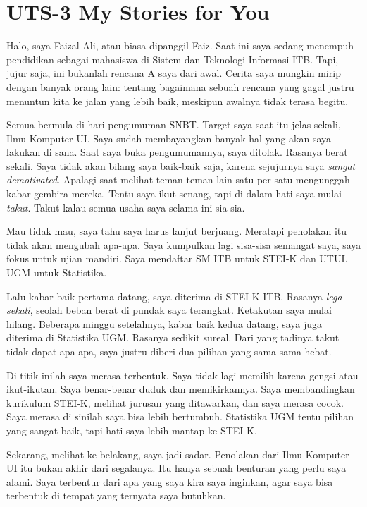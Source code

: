 \documentclass[
  letterpaper,
  DIV=11,
  numbers=noendperiod]{scrreprt}
\begin{document}

\chapter{UTS-3 My Stories for You}\label{uts-3-my-stories-for-you}

Halo, saya Faizal Ali, atau biasa dipanggil Faiz. Saat ini saya sedang
menempuh pendidikan sebagai mahasiswa di Sistem dan Teknologi Informasi
ITB. Tapi, jujur saja, ini bukanlah rencana A saya dari awal. Cerita
saya mungkin mirip dengan banyak orang lain: tentang bagaimana sebuah
rencana yang gagal justru menuntun kita ke jalan yang lebih baik,
meskipun awalnya tidak terasa begitu.

Semua bermula di hari pengumuman SNBT. Target saya saat itu jelas
sekali, Ilmu Komputer UI. Saya sudah membayangkan banyak hal yang akan
saya lakukan di sana. Saat saya buka pengumumannya, saya ditolak.
Rasanya berat sekali. Saya tidak akan bilang saya baik-baik saja, karena
sejujurnya saya \emph{sangat demotivated}. Apalagi saat melihat
teman-teman lain satu per satu mengunggah kabar gembira mereka. Tentu
saya ikut senang, tapi di dalam hati saya mulai \emph{takut}. Takut
kalau semua usaha saya selama ini sia-sia.

Mau tidak mau, saya tahu saya harus lanjut berjuang. Meratapi penolakan
itu tidak akan mengubah apa-apa. Saya kumpulkan lagi sisa-sisa semangat
saya, saya fokus untuk ujian mandiri. Saya mendaftar SM ITB untuk STEI-K
dan UTUL UGM untuk Statistika.

Lalu kabar baik pertama datang, saya diterima di STEI-K ITB. Rasanya
\emph{lega sekali}, seolah beban berat di pundak saya terangkat.
Ketakutan saya mulai hilang. Beberapa minggu setelahnya, kabar baik
kedua datang, saya juga diterima di Statistika UGM. Rasanya sedikit
sureal. Dari yang tadinya takut tidak dapat apa-apa, saya justru diberi
dua pilihan yang sama-sama hebat.

Di titik inilah saya merasa terbentuk. Saya tidak lagi memilih karena
gengsi atau ikut-ikutan. Saya benar-benar duduk dan memikirkannya. Saya
membandingkan kurikulum STEI-K, melihat jurusan yang ditawarkan, dan
saya merasa cocok. Saya merasa di sinilah saya bisa lebih bertumbuh.
Statistika UGM tentu pilihan yang sangat baik, tapi hati saya lebih
mantap ke STEI-K.

Sekarang, melihat ke belakang, saya jadi sadar. Penolakan dari Ilmu
Komputer UI itu bukan akhir dari segalanya. Itu hanya sebuah benturan
yang perlu saya alami. Saya terbentur dari apa yang saya kira saya
inginkan, agar saya bisa terbentuk di tempat yang ternyata saya
butuhkan.
\end{document}
